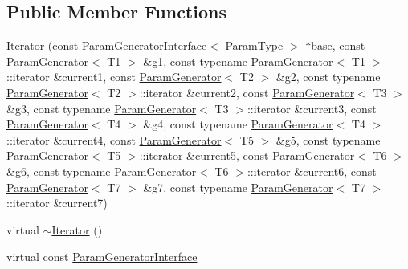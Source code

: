 \subsection*{\-Public \-Member \-Functions}
\begin{DoxyCompactItemize}
\item 
\hyperlink{classtesting_1_1internal_1_1CartesianProductGenerator7_1_1Iterator_ae16431b73a56827cff82091ad21563d5}{\-Iterator} (const \hyperlink{classtesting_1_1internal_1_1ParamGeneratorInterface}{\-Param\-Generator\-Interface}$<$ \hyperlink{classtesting_1_1internal_1_1CartesianProductGenerator7_a18469e04d44a379d754ff5044f09531f}{\-Param\-Type} $>$ $\ast$base, const \hyperlink{classtesting_1_1internal_1_1ParamGenerator}{\-Param\-Generator}$<$ \-T1 $>$ \&g1, const typename \hyperlink{classtesting_1_1internal_1_1ParamGenerator}{\-Param\-Generator}$<$ \-T1 $>$\-::iterator \&current1, const \hyperlink{classtesting_1_1internal_1_1ParamGenerator}{\-Param\-Generator}$<$ \-T2 $>$ \&g2, const typename \hyperlink{classtesting_1_1internal_1_1ParamGenerator}{\-Param\-Generator}$<$ \-T2 $>$\-::iterator \&current2, const \hyperlink{classtesting_1_1internal_1_1ParamGenerator}{\-Param\-Generator}$<$ \-T3 $>$ \&g3, const typename \hyperlink{classtesting_1_1internal_1_1ParamGenerator}{\-Param\-Generator}$<$ \-T3 $>$\-::iterator \&current3, const \hyperlink{classtesting_1_1internal_1_1ParamGenerator}{\-Param\-Generator}$<$ \-T4 $>$ \&g4, const typename \hyperlink{classtesting_1_1internal_1_1ParamGenerator}{\-Param\-Generator}$<$ \-T4 $>$\-::iterator \&current4, const \hyperlink{classtesting_1_1internal_1_1ParamGenerator}{\-Param\-Generator}$<$ \-T5 $>$ \&g5, const typename \hyperlink{classtesting_1_1internal_1_1ParamGenerator}{\-Param\-Generator}$<$ \-T5 $>$\-::iterator \&current5, const \hyperlink{classtesting_1_1internal_1_1ParamGenerator}{\-Param\-Generator}$<$ \-T6 $>$ \&g6, const typename \hyperlink{classtesting_1_1internal_1_1ParamGenerator}{\-Param\-Generator}$<$ \-T6 $>$\-::iterator \&current6, const \hyperlink{classtesting_1_1internal_1_1ParamGenerator}{\-Param\-Generator}$<$ \-T7 $>$ \&g7, const typename \hyperlink{classtesting_1_1internal_1_1ParamGenerator}{\-Param\-Generator}$<$ \-T7 $>$\-::iterator \&current7)
\item 
virtual \hyperlink{classtesting_1_1internal_1_1CartesianProductGenerator7_1_1Iterator_a47b331bac1d130f2bab2c40e76ccb54a}{$\sim$\-Iterator} ()
\item 
virtual const \*
\hyperlink{classtesting_1_1internal_1_1ParamGeneratorInterface}{\-Param\-Generator\-Interface}\*

\end{DoxyCompactItemize}
